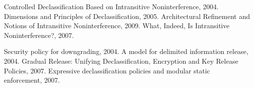 \newpage
\begin{thebibliography}{10}
Controlled Declassification Based on Intransitive Noninterference, 2004.
Dimensions and Principles of Declassification, 2005.
Architectural Refinement and Notions of Intransitive Noninterference, 2009.
What, Indeed, Is Intransitive Noninterference?, 2007.


Security policy for downgrading, 2004.
A model for delimited information release, 2004.
Gradual Release: Unifying Declassification, Encryption and Key Release Policies,
2007.
Expressive declassification policies and modular static enforcement, 2007.

\end{thebibliography}
